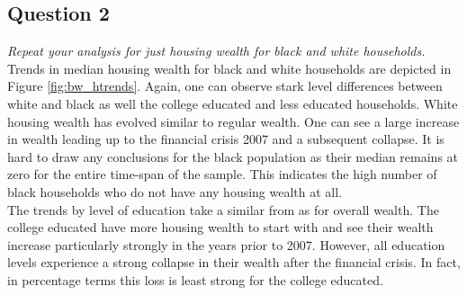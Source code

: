 \documentclass[]{scrartcl}
\begin{document}
\subsection*{Question 2}
\textit{Repeat your analysis for just housing wealth for black and white households.} \\

Trends in median housing wealth for black and white households are depicted in Figure \ref{fig:bw_htrends}.
Again, one can observe stark level differences between white and black as well the college educated and less educated households. White housing wealth has evolved similar to regular wealth. One can see a large increase in wealth leading up to the financial crisis 2007 and a subsequent collapse. It is hard to draw any conclusions for the black population as their median remains at zero for the entire time-span of the sample. This indicates the high number of black households who do not have any housing wealth at all. \\
The trends by level of education take a similar from as for overall wealth. The college educated have more housing wealth to start with and see their wealth increase particularly strongly in the years prior to 2007. However, all education levels experience a strong collapse in their wealth after the financial crisis. In fact, in percentage terms this loss is least strong for the college educated.
\end{document}
